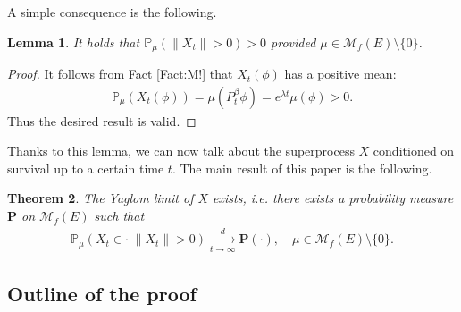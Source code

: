 \documentclass[12pt,a4paper]{amsart}
\numberwithin{equation}{section}
\theoremstyle{plain}
\newtheorem{thm}{Theorem}[section]
\newtheorem{lem}[thm]{Lemma}
\theoremstyle{definition}
\theoremstyle{remark}
\begin{document}
A simple consequence is the following.
\begin{lem} \label{Lemma:Nd!}
It holds that $\mathbb P_\mu(\|X_t\| > 0) > 0$ provided $\mu \in \mathcal M_f(E)\setminus \{0\}$.
\end{lem}
\begin{proof}
It follows from Fact \ref{Fact:M!} that $X_t(\phi)$ has a positive mean:
\begin{align}
\mathbb P_\mu(X_t(\phi))
= \mu(P_t^\beta \phi)
=e^{\lambda t}\mu(\phi)>0.
\end{align}
Thus the desired result is valid.
\end{proof}
Thanks to this lemma, we can now talk about the superprocess $X$ conditioned on survival up to a certain time $t$.
The main result of this paper is the following.
\begin{thm} \label{Theorem:Y:H1:H2:H3:H4}
The Yaglom limit of $X$ exists, i.e. there exists a probability measure $\mathbf P$ on $\mathcal M_f(E)$ such that
\begin{align}
 \mathbb P_\mu (X_t \in \cdot | \|X_t\|> 0 )
 \xrightarrow[t\to \infty]{d} \mathbf P(\cdot),
 \quad \mu \in \mathcal M_f(E)\setminus \{0\}.
 \end{align}
\end {thm}
\subsection{Outline of the proof}
\end{document}
